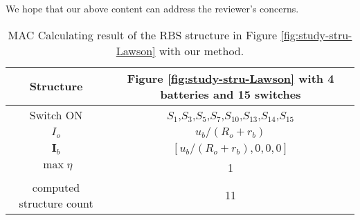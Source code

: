 \begin{revresponse}
We hope that our above content can address the reviewer's concerns.


\begin{table}[htbp]
  \centering
    \caption{MAC Calculating result of the RBS structure in Figure \ref{fig:study-stru-Lawson} with our method.}
    \begin{tabular}{cc}
    \toprule
        Structure & Figure \ref{fig:study-stru-Lawson} with 4 batteries and 15 switches  \\
    \midrule
    Switch ON & $S_1$,$S_3$,$S_5$,$S_7$,$S_{10}$,$S_{13}$,$S_{14}$,$S_{15}$ \\
    $I_o$ & $u_b/(R_o+r_b)$ \\
    $\bm{I}_b$ & $[u_b/(R_o+r_b),0,0,0]$ \\
    $\max  \eta$     & 1 \\
    computed structure count & 11 \\
    \bottomrule
    \end{tabular}
  \label{tab:study-results-Lawson-greedy}
\end{table}


\end{revresponse}
